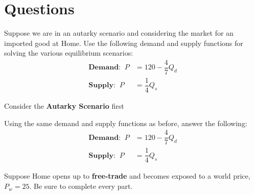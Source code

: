 \documentclass[12pt]{exam}
\begin{document}
\section*{Questions}
\begin{questions}

\question
Suppose we are in an autarky scenario and considering the market for an imported good at Home. 
Use the following demand and supply functions for solving the various equilibrium scenarios:
\begin{align*}
    \textbf{Demand:} \;\; P &= 120 - \dfrac{4}{7}Q_{d} \\
    \textbf{Supply:} \;\; P &= \dfrac{1}{4}Q_{s}
\end{align*}

Consider the \textbf{Autarky Scenario} first


\newpage 

\question
Using the same demand and supply functions as before, answer the following:
\begin{align*}
    \textbf{Demand:} \;\; P &= 120 - \dfrac{4}{7}Q_{d} \\
    \textbf{Supply:} \;\; P &= \dfrac{1}{4}Q_{s}
\end{align*}

Suppose Home opens up to \textbf{free-trade} and becomes exposed to a world price, $P_{w} = 25$.
Be sure to complete every part.
\begin{parts}

\end{parts}
\end{questions}
\end{document}

